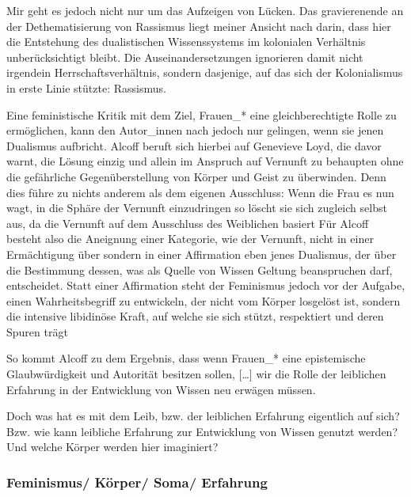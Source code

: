 Mir geht es jedoch nicht nur um das Aufzeigen von Lücken. Das gravierenende an
der Dethematisierung von Rassismus liegt meiner Ansicht nach darin, dass hier
die Entstehung des dualistischen Wissenssystems im kolonialen Verhältnis
unberücksichtigt bleibt. Die Auseinandersetzungen ignorieren damit nicht
irgendein Herrschaftsverhältnis, sondern dasjenige, auf das sich der
Kolonialismus in erste Linie stützte: Rassismus.

Eine feministische Kritik mit
dem Ziel, Frauen\_* eine gleichberechtigte Rolle zu ermöglichen, kann den
Autor\_innen nach jedoch  nur gelingen, wenn sie jenen Dualismus aufbricht.
Alcoff beruft sich hierbei auf Genevieve Loyd, die davor warnt, die Lösung
einzig und allein im Anspruch auf Vernunft zu behaupten ohne die gefährliche
Gegenüberstellung von Körper und Geist zu überwinden. Denn dies führe zu nichts
anderem als dem eigenen Ausschluss: \glqq Wenn die Frau es nun wagt, in die Sphäre
der Vernunft einzudringen so löscht sie sich zugleich selbst aus, da die
Vernunft auf dem Ausschluss des Weiblichen basiert \grqq \footnotemark
{} Für Alcoff besteht also
die Aneignung einer Kategorie, wie der Vernunft, nicht in einer Ermächtigung
über sondern in einer Affirmation eben jenes Dualismus, der über die Bestimmung
dessen, was als Quelle von Wissen Geltung beanspruchen darf, entscheidet. Statt
einer Affirmation steht der Feminismus jedoch vor der Aufgabe, einen
Wahrheitsbegriff zu entwickeln, der nicht vom Körper losgelöst ist, sondern
\glqq
die intensive libidinöse Kraft, auf welche sie sich stützt, respektiert und
deren Spuren trägt \grqq \footnotemark {}

So kommt Alcoff zu dem Ergebnis, dass \glqq wenn Frauen\_* eine
epistemische Glaubwürdigkeit und Autorität besitzen sollen, […] wir die Rolle
der leiblichen Erfahrung in der Entwicklung von Wissen neu erwägen \grqq
\footnotemark {} müssen.

Doch was hat es mit dem Leib, bzw. der leiblichen Erfahrung eigentlich auf
sich? Bzw. wie kann leibliche Erfahrung zur Entwicklung von Wissen genutzt
werden? Und welche Körper werden hier imaginiert?

\subsubsection{Feminismus/ Körper/ Soma/ Erfahrung}

